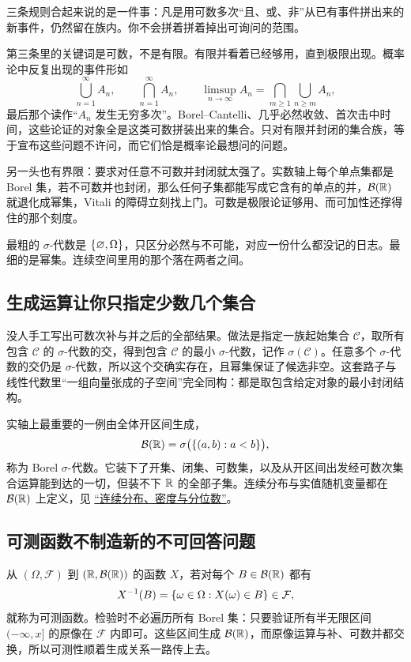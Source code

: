 三条规则合起来说的是一件事：凡是用可数多次``且、或、非''从已有事件拼出来的新事件，仍然留在族内。你不会拼着拼着掉出可询问的范围。

第三条里的关键词是可数，不是有限。有限并看着已经够用，直到极限出现。概率论中反复出现的事件形如
\[
\bigcup_{n=1}^{\infty}A_n,\qquad
\bigcap_{n=1}^{\infty}A_n,\qquad
\limsup_{n\to\infty} A_n=\bigcap_{m\ge1}\bigcup_{n\ge m}A_n,
\]
最后那个读作``\(A_n\) 发生无穷多次''。Borel--Cantelli、几乎必然收敛、首次击中时间，这些论证的对象全是这类可数拼装出来的集合。只对有限并封闭的集合族，等于宣布这些问题不许问，而它们恰是概率论最想问的问题。

另一头也有界限：要求对任意不可数并封闭就太强了。实数轴上每个单点集都是 Borel 集，若不可数并也封闭，那么任何子集都能写成它含有的单点的并，\(\mathcal B(\mathbb{R})\) 就退化成幂集，Vitali 的障碍立刻找上门。可数是极限论证够用、而可加性还撑得住的那个刻度。

最粗的 \(\sigma\)-代数是 \(\left\{\varnothing,\Omega\right\}\)，只区分必然与不可能，对应一份什么都没记的日志。最细的是幂集。连续空间里用的那个落在两者之间。

\subsection{生成运算让你只指定少数几个集合}

没人手工写出可数次补与并之后的全部结果。做法是指定一族起始集合 \(\mathcal C\)，取所有包含 \(\mathcal C\) 的 \(\sigma\)-代数的交，得到包含 \(\mathcal C\) 的最小 \(\sigma\)-代数，记作 \(\sigma(\mathcal C)\)。任意多个 \(\sigma\)-代数的交仍是 \(\sigma\)-代数，所以这个交确实存在，且幂集保证了候选非空。这套路子与线性代数里``一组向量张成的子空间''完全同构：都是取包含给定对象的最小封闭结构。

实轴上最重要的一例由全体开区间生成，
\[
\mathcal B(\mathbb{R})=\sigma\bigl(\left\{(a,b):a<b\right\}\bigr),
\]
称为 Borel \(\sigma\)-代数。它装下了开集、闭集、可数集，以及从开区间出发经可数次集合运算能到达的一切，但装不下 \(\mathbb{R}\) 的全部子集。连续分布与实值随机变量都在 \(\mathcal B(\mathbb{R})\) 上定义，见 \hyperref[sec:05-Probability/03-Random-Variables/03]{``连续分布、密度与分位数''}。

\subsection{可测函数不制造新的不可回答问题}

从 \((\Omega,\mathcal F)\) 到 \((\mathbb{R},\mathcal B(\mathbb{R}))\) 的函数 \(X\)，若对每个 \(B\in\mathcal B(\mathbb{R})\) 都有
\[
X^{-1}(B)=\left\{\omega\in\Omega : X(\omega)\in B\right\}\in\mathcal F,
\]
就称为可测函数。检验时不必遍历所有 Borel 集：只要验证所有半无限区间 \((-\infty,x]\) 的原像在 \(\mathcal F\) 内即可。这些区间生成 \(\mathcal B(\mathbb{R})\)，而原像运算与补、可数并都交换，所以可测性顺着生成关系一路传上去。

